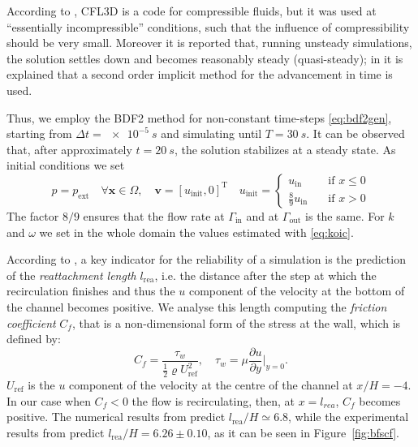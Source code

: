 According to \cite{web:nasa}, CFL3D is a code for compressible fluids, but it was used at ``essentially incompressible'' conditions, such that the influence of compressibility should be very small. Moreover it is reported that, running unsteady simulations, the solution settles down and becomes reasonably steady (quasi-steady); in \cite{bfs:cfl3d} it is explained that a second order implicit method for the advancement in time is used.

Thus, we employ the BDF2 method for non-constant time-steps \eqref{eq:bdf2gen}, starting from $\Delta t = \SI{e-5}{s}$ and simulating until $T = \SI{30}{s}$. It can be observed that, after approximately $t=\SI{20}{s}$, the solution stabilizes at a steady state. As initial conditions we set
\begin{equation}
p=p_\text{ext} \quad \forall \mathbf{x} \in \Omega, \quad \mathbf{v} = [u_\text{init},0]^\mathrm{T} \quad u_\text{init} = \begin{cases}
u_\text{in} \quad&\text{if $x\leq 0$}\\
\frac{8}{9}u_\text{in} \quad&\text{if $x>0$}
\end{cases}
\end{equation}
The factor $8/9$ ensures that the flow rate at $\Gamma_\text{in}$ and at $\Gamma_\text{out}$ is the same. For $k$ and $\omega$ we set in the whole domain the values estimated with \eqref{eq:koic}.

According to \cite{web:nasa}, a key indicator for the reliability of a 
simulation is the prediction of the \emph{reattachment length} $l_\text{rea}$, 
i.e. the distance after the step at which the recirculation finishes and thus 
the $u$ component of the velocity at the bottom of the channel becomes 
positive. We analyse this length computing the \emph{friction coefficient} 
$C_f$, that is a non-dimensional form of the stress at the wall, which is 
defined by:
\begin{equation}
C_f = \frac{\tau_w}{\frac{1}{2}\varrho U_\text{ref}^2}, \quad \tau_w = \mu \frac{\partial u}{\partial y} \Big|_{y=0}.
\end{equation}
$U_\text{ref}$ is the $u$ component of the velocity at the centre of the channel at $x/H=-4$. In our case when $C_f<0$ the flow is recirculating, then, at $x=l_{rea}$, $C_f$ becomes positive. The numerical results from \cite{web:nasa} predict $l_\text{rea}/H \simeq 6.8$, while the experimental results from \cite{bfs:driver} predict $l_\text{rea}/H = 6.26 \pm 0.10$, as it can be seen in Figure~\ref{fig:bfscf}.

